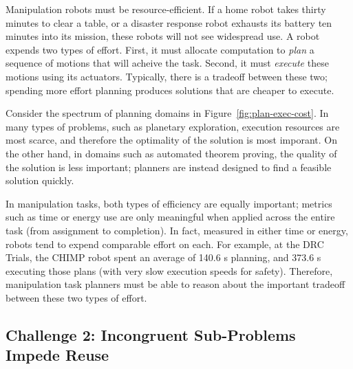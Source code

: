 
Manipulation robots must be resource-efficient.
If a home robot takes thirty minutes to clear a table,
or a disaster response robot exhausts its battery ten minutes
into its mission,
these robots will not see widespread use.
A robot expends two types of effort.
First, it must allocate computation to \emph{plan}
a sequence of motions that will acheive the task.
Second, it must \emph{execute} these motions using its actuators.
Typically, there is a tradeoff between these two;
spending more effort planning produces solutions that are
cheaper to execute.

Consider the spectrum of planning domains
in Figure~\ref{fig:plan-exec-cost}.
In many types of problems,
such as planetary exploration,
execution resources are most scarce,
and therefore the optimality of the solution is most imporant.
On the other hand,
in domains such as automated theorem proving,
the quality of the solution is less important;
planners are instead designed to find a feasible solution quickly.

In manipulation tasks,
both types of efficiency are equally important;
metrics such as time or energy use are only meaningful
when applied across the entire task (from assignment to completion).
In fact, measured in either time or energy,
robots tend to expend comparable effort on each.
For example, at the DRC Trials,
the CHIMP robot spent an average of 140.6 s planning,
and 373.6 s executing those plans
(with very slow execution speeds for safety).
Therefore,
manipulation task planners must be able to reason about
the important tradeoff between these two types of effort.

\subsection*{Challenge 2: Incongruent Sub-Problems Impede Reuse}

